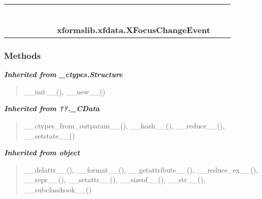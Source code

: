     \label{xformslib:xfdata:XFocusChangeEvent}
\begin{tabular}{cccccccccc}
\multicolumn{2}{r}{\settowidth{\BCL}{object}\multirow{2}{\BCL}{object}}
&&
&&
&&
  \\\cline{3-3}
  &&\multicolumn{1}{c|}{}
&&
&&
&&
  \\
\multicolumn{4}{r}{\settowidth{\BCL}{??.\_CData}\multirow{2}{\BCL}{??.\_CData}}
&&
&&
  \\\cline{5-5}
  &&&&\multicolumn{1}{c|}{}
&&
&&
  \\
\multicolumn{6}{r}{\settowidth{\BCL}{\_ctypes.Structure}\multirow{2}{\BCL}{\_ctypes.Structure}}
&&
  \\\cline{7-7}
  &&&&&&\multicolumn{1}{c|}{}
&&
  \\
&&&&&&\multicolumn{2}{l}{\textbf{xformslib.xfdata.XFocusChangeEvent}}
\end{tabular}



  \subsubsection{Methods}


\large{\textbf{\textit{Inherited from \_ctypes.Structure}}}

\begin{quote}
\_\_init\_\_(), \_\_new\_\_()
\end{quote}

\large{\textbf{\textit{Inherited from ??.\_CData}}}

\begin{quote}
\_\_ctypes\_from\_outparam\_\_(), \_\_hash\_\_(), \_\_reduce\_\_(), \_\_setstate\_\_()
\end{quote}

\large{\textbf{\textit{Inherited from object}}}

\begin{quote}
\_\_delattr\_\_(), \_\_format\_\_(), \_\_getattribute\_\_(), \_\_reduce\_ex\_\_(), \_\_repr\_\_(), \_\_setattr\_\_(), \_\_sizeof\_\_(), \_\_str\_\_(), \_\_subclasshook\_\_()
\end{quote}

